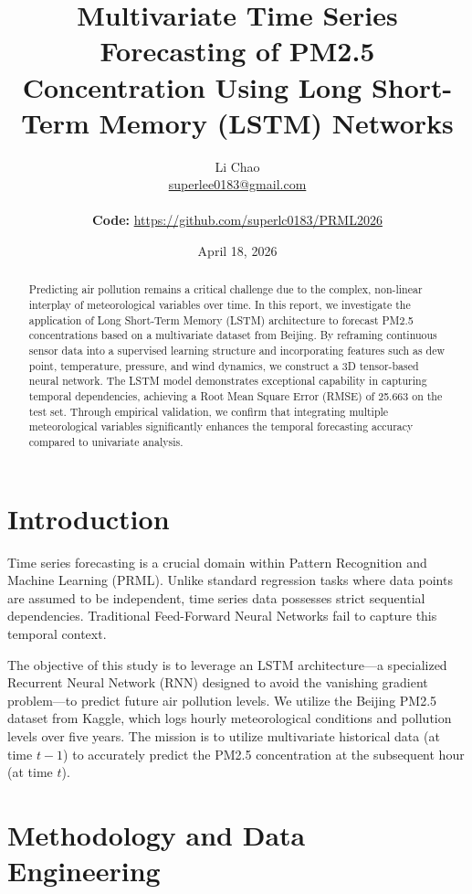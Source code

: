 \documentclass[12pt,a4paper]{article}
\title{\textbf{\Large Multivariate Time Series Forecasting of PM2.5 Concentration Using Long Short-Term Memory (LSTM) Networks}}
\author{
    Li Chao \\ 
    \href{mailto:superlee0183@gmail.com}{superlee0183@gmail.com} \\
    \vspace{0.1cm} \\
    \normalsize \textbf{Code:} \url{https://github.com/superlc0183/PRML2026}
}
\date{April 18, 2026}
\begin{document}
\maketitle 

\begin{abstract}
Predicting air pollution remains a critical challenge due to the complex, non-linear interplay of meteorological variables over time. In this report, we investigate the application of Long Short-Term Memory (LSTM) architecture to forecast PM2.5 concentrations based on a multivariate dataset from Beijing. By reframing continuous sensor data into a supervised learning structure and incorporating features such as dew point, temperature, pressure, and wind dynamics, we construct a 3D tensor-based neural network. The LSTM model demonstrates exceptional capability in capturing temporal dependencies, achieving a Root Mean Square Error (RMSE) of 25.663 on the test set. Through empirical validation, we confirm that integrating multiple meteorological variables significantly enhances the temporal forecasting accuracy compared to univariate analysis.
\end{abstract}

\newpage
\renewcommand{\contentsname}{\large\bfseries\filcenter Contents}
\tableofcontents
\newpage

\section{Introduction}
Time series forecasting is a crucial domain within Pattern Recognition and Machine Learning (PRML). Unlike standard regression tasks where data points are assumed to be independent, time series data possesses strict sequential dependencies. Traditional Feed-Forward Neural Networks fail to capture this temporal context. 

The objective of this study is to leverage an LSTM architecture—a specialized Recurrent Neural Network (RNN) designed to avoid the vanishing gradient problem—to predict future air pollution levels. We utilize the Beijing PM2.5 dataset from Kaggle, which logs hourly meteorological conditions and pollution levels over five years. The mission is to utilize multivariate historical data (at time $t-1$) to accurately predict the PM2.5 concentration at the subsequent hour (at time $t$).

\section{Methodology and Data Engineering}
\end{document}

